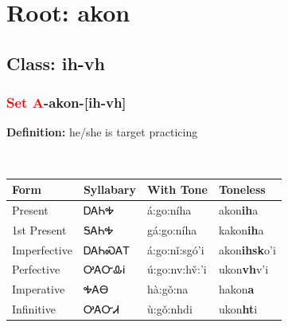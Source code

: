 \needspace{4in}
\section*{Root: akon}
\nopagebreak
{}
\needspace{3in}
\subsection*{Class: ih-vh}
\nopagebreak
\needspace{2in}
\subsubsection*{\textcolor{Red}{Set A}{-}\textbf{akon}{-}[ih-vh]}
\nopagebreak
\textbf{Definition: } he/she is target practicing
\\[0.5em]
\begin{tabularx}{\textwidth}{l X X X}%
\toprule%
\textbf{Form}&\textbf{Syllabary}&\textbf{With Tone}&\textbf{Toneless}\\%
\midrule%
Present&ᎠᎪᏂᎭ&á:go:níha&akon\textbf{ih}a\\%
1st Present&ᎦᎪᏂᎭ&gá:go:níha&kakon\textbf{ih}a\\%
Imperfective&ᎠᎪᏂᏍᎪᎢ&á:go:nǐ:sgó’i&akon\textbf{ihsk}o'i\\%
Perfective&ᎤᎪᏅᎲᎥ&ú:go:nv:hv̌:’i&ukon\textbf{vh}v'i\\%
Imperative&ᎭᎪᎾ&hà:gǒ:na&hakon\textbf{a}\\%
Infinitive&ᎤᎪᏅᏗ&ù:gǒ:nhdi&ukon\textbf{ht}i\\%
\bottomrule%
\end{tabularx}
\\[1em]